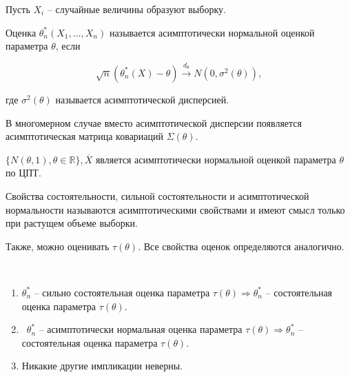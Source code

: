 Пусть $\displaystyle X_{i}$ -- случайные величины образуют выборку.
\begin{definition}
Оценка $\displaystyle \theta _{n}^{*}( X_{1} ,\dotsc ,X_{n})$ называется асимптотически нормальной оценкой параметра $\displaystyle \theta $, если


\begin{equation*}
\sqrt{n}\left( \theta _{n}^{*}( X) -\theta \right)\xrightarrow{d_{\theta }} N\left( 0,\sigma ^{2}( \theta )\right) ,
\end{equation*}


где $\displaystyle \sigma ^{2}( \theta )$ называется асимптотической дисперсией.
\end{definition}
\begin{note}
В многомерном случае вместо асимптотической дисперсии появляется асимптотическая матрица ковариаций $\displaystyle \Sigma ( \theta )$.
\end{note}
\begin{example}
$\displaystyle \{N( \theta ,1) ,\theta \in \mathbb{R}\} ,\overline{X}$ является асимптотически нормальной оценкой параметра $\displaystyle \theta $ по ЦПТ.
\end{example}
\begin{note}
Свойства состоятельности, сильной состоятельности и асимптотической нормальности называются асимптотическими свойствами и имеют смысл только при растущем объеме выборки.
\end{note}
\begin{note}
Также, можно оценивать $\displaystyle \tau ( \theta )$. Все свойства оценок определяются аналогично.
\end{note}
\begin{theorem} \
\begin{enumerate}
    \item $\displaystyle \theta _{n}^{*}$ -- сильно состоятельная оценка параметра $\displaystyle \tau ( \theta )$$\displaystyle \Rightarrow $$\displaystyle \theta _{n}^{*}$ -- состоятельная оценка параметра $\displaystyle \tau ( \theta )$.
    
    \item \ $\displaystyle \theta _{n}^{*}$ -- асимптотически нормальная оценка параметра $\displaystyle \tau ( \theta )$$\displaystyle \Rightarrow $$\displaystyle \theta _{n}^{*}$ -- состоятельная оценка параметра $\displaystyle \tau ( \theta )$.
    
    \item Никакие другие импликации неверны.
\end{enumerate}

\end{theorem}
